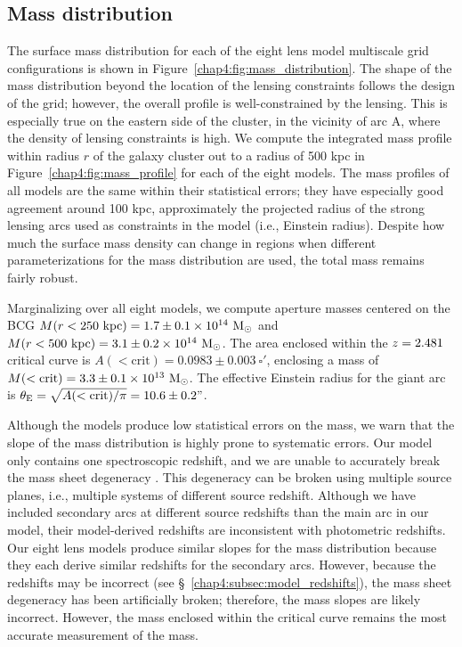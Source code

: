 \subsection{Mass distribution}

The surface mass distribution for each of the eight lens model multiscale grid configurations is shown in Figure~\ref{chap4:fig:mass_distribution}. The shape of the mass distribution beyond the location of the lensing constraints follows the design of the grid; however, the overall profile is well-constrained by the lensing. This is especially true on the eastern side of the cluster, in the vicinity of arc A, where the density of lensing constraints is high. We compute the integrated mass profile within radius $r$ of the galaxy cluster out to a radius of 500 kpc in Figure~\ref{chap4:fig:mass_profile} for each of the eight models. The mass profiles of all models are the same within their statistical errors; they have especially good agreement around 100 kpc, approximately the projected radius of the strong lensing arcs used as constraints in the model (i.e., Einstein radius). Despite how much the surface mass density can change in regions when different parameterizations for the mass distribution are used, the total mass remains fairly robust.

Marginalizing over all eight models, we compute aperture masses centered on the BCG $M(r<250\ \mathrm{kpc}) = 1.7\pm0.1\times10^{14}\ \mathrm{M_\odot}$ and $M(r<500\ \mathrm{kpc}) = 3.1\pm0.2\times10^{14}\ \msol$. The area enclosed within the $z=2.481$ critical curve is $A(<\mathrm{crit}) = 0.0983\pm0.003\ \square'$, enclosing a mass of $M(<\mathrm{crit}) = 3.3\pm0.1\times10^{13}\ \mathrm{M_\odot}$. The effective Einstein radius for the giant arc is $\theta_\mathrm{E} = \sqrt{A(<\mathrm{crit})/\pi} = 10.6\pm0.2"$.

Although the models produce low statistical errors on the mass, we warn that the slope of the mass distribution is highly prone to systematic errors. Our model only contains one spectroscopic redshift, and we are unable to accurately break the mass sheet degeneracy \citep{Schneider:1995vn}. This degeneracy can be broken using multiple source planes, i.e., multiple systems of different source redshift. Although we have included secondary arcs at different source redshifts than the main arc in our model, their model-derived redshifts are inconsistent with photometric redshifts. Our eight lens models produce similar slopes for the mass distribution because they each derive similar redshifts for the secondary arcs. However, because the redshifts may be incorrect (see \S~\ref{chap4:subsec:model_redshifts}), the mass sheet degeneracy has been artificially broken; therefore, the mass slopes are likely incorrect. However, the mass enclosed within the critical curve remains the most accurate measurement of the mass.

